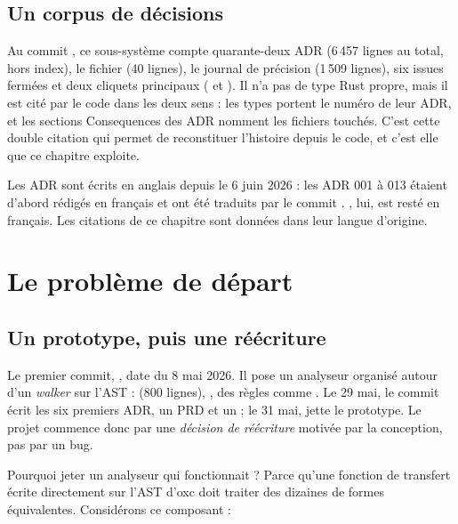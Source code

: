 \subsection{Un corpus de décisions}

Au commit , ce sous-système compte quarante-deux ADR (6\,457 lignes au total, hors index), le fichier  (40 lignes), le journal de précision (1\,509 lignes), six issues fermées  et deux cliquets principaux ( et ). Il n'a pas de type Rust propre, mais il est cité par le code dans les deux sens : les types portent le numéro de leur ADR, et les sections \og Consequences\fg{} des ADR nomment les fichiers touchés. C'est cette double citation qui permet de reconstituer l'histoire depuis le code, et c'est elle que ce chapitre exploite.

\begin{remarque}
Les ADR sont écrits en anglais depuis le 6 juin 2026 : les ADR 001 à 013 étaient d'abord rédigés en français et ont été traduits par le commit . , lui, est resté en français. Les citations de ce chapitre sont données dans leur langue d'origine.
\end{remarque}

\section{Le problème de départ}
\label{sec:histoire-doctrine-depart}

\subsection{Un prototype, puis une réécriture}

Le premier commit, , date du 8 mai 2026. Il pose un analyseur organisé autour d'un \emph{walker} sur l'AST :  (800 lignes), , des règles comme . Le 29 mai, le commit  écrit les six premiers ADR, un PRD et un  ; le 31 mai,  jette le prototype. Le projet commence donc par une \emph{décision de réécriture} motivée par la conception, pas par un bug.

Pourquoi jeter un analyseur qui fonctionnait ? Parce qu'une fonction de transfert écrite directement sur l'AST d'oxc doit traiter des dizaines de formes équivalentes. Considérons ce composant :

